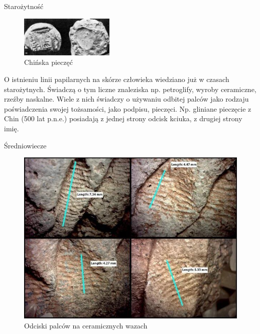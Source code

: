 \documentclass{beamer}
\begin{document}
\begin{frame}{Starożytność}
    \begin{figure}
        \centering
        \includegraphics[width=0.4\textwidth]{History/ancient_seals.jpg}
        \caption{Chińska pieczęć}
    \end{figure}
    \justifying
    O istnieniu linii papilarnych na skórze człowieka wiedziano już w czasach starożytnych. Świadczą o tym liczne znaleziska np. petroglify, wyroby ceramiczne, rzeźby naskalne. Wiele z nich świadczy o używaniu odbitej palców jako rodzaju poświadczenia swojej tożsamości, jako podpisu, pieczęci. Np. gliniane pieczęcie z Chin (500 lat p.n.e.) posiadają z jednej strony odcisk kciuka, z drugiej strony imię.
\end{frame}

\begin{frame}{Średniowiecze}
    \begin{figure}[t]
        \centering
        \includegraphics[width=0.5\linewidth]{History/ancient_fingerprints.jpg}
        \caption{Odciski palców na ceramicznych wazach }
    \end{figure}
\end{frame}
\end{document}
